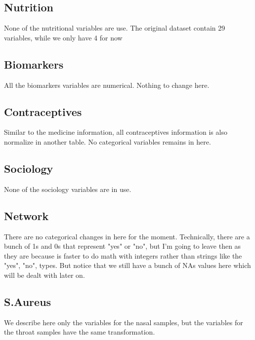 \subsection{Nutrition}

None of the nutritional variables are use. The original dataset contain 29 variables, while we only have 4 for now

\subsection{Biomarkers}

All the biomarkers variables are numerical. Nothing to change here. \vspace{3 mm}

\subsection{Contraceptives}

Similar to the medicine information, all contraceptives information is also normalize in another table. No categorical variables remains in here.\vspace{3 mm}

\subsection{Sociology}

None of the sociology variables are in use. \vspace{3 mm}

\subsection{Network}

There are no categorical changes in here for the moment. Technically, there are a bunch of 1s and 0s that represent "yes" or "no", but I'm going to leave then as they are because is faster to do math with integers rather than strings like the "yes", "no", types. But notice that we still have a bunch of NAs values here which will be dealt with later on.\vspace{3 mm}

\subsection{S.Aureus}

We describe here only the variables for the nasal samples, but the variables for the throat samples have the same transformation.\vspace{3 mm}


